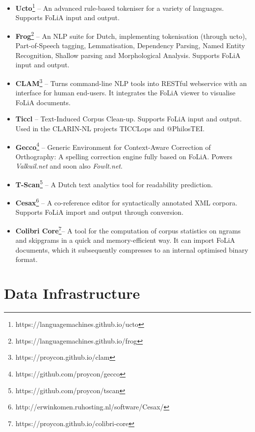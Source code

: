 \documentclass[a4paper,11pt]{article}
\begin{document}
\begin{itemize}
\item \textbf{\textbf{Ucto}}\footnote{https://languagemachines.github.io/ucto} -- An advanced rule-based tokeniser for a variety of
    languages. Supports FoLiA
    input and output. \cite{UCTO}
\item \textbf{\textbf{Frog}}\footnote{https://languagemachines.github.io/frog} -- An NLP suite for Dutch, implementing tokenisation (through
    ucto), Part-of-Speech tagging, Lemmatisation, Dependency Parsing, Named
    Entity Recognition, Shallow parsing and Morphological Analysis. Supports
    FoLiA input and output.
\item \textbf{\textbf{CLAM}}\footnote{https://proycon.github.io/clam} -- Turns command-line NLP tools into RESTful webservice with an
    interface for human end-users. It integrates the FoLiA viewer to visualise
    FoLiA documents. \cite{CLAM}
\item \textbf{\textbf{Ticcl}} -- Text-Induced Corpus Clean-up. Supports FoLiA
    input and output. Used in the
    CLARIN-NL projects TICCLops and @PhilosTEI. \cite{Reynaert2010} %
\item \textbf{\textbf{Gecco}}\footnote{https://github.com/proycon/gecco}  -- Generic Environment for Context-Aware Correction
    of Orthography: A spelling correction engine fully based on FoLiA. Powers
    \emph{Valkuil.net} and soon also \emph{Fowlt.net}.
\item \textbf{\textbf{T-Scan}}\footnote{https://github.com/proycon/tscan} -- A Dutch text analytics tool for readability
    prediction. \cite{TSCAN}
\item \textbf{\textbf{Cesax}}\footnote{http://erwinkomen.ruhosting.nl/software/Cesax/} -- A co-reference editor for syntactically annotated XML corpora.
    Supports FoLiA import and output through conversion. 
\item \textbf{\textbf{Colibri Core}}\footnote{https://proycon.github.io/colibri-core}-- A tool for the computation
    of corpus statistics on ngrams and skipgrams in a quick and
    memory-efficient way. It can import FoLiA documents, which it subsequently
    compresses to an internal optimised binary format.
\end{itemize}


\section{Data Infrastructure}
\label{sec:datainfrastructure}
\end{document}
